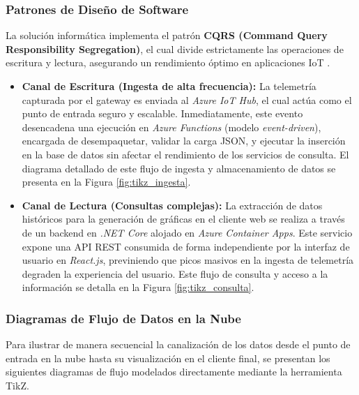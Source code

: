 \subsubsection{Patrones de Diseño de Software}
La solución informática implementa el patrón \textbf{CQRS (Command Query Responsibility Segregation)}, el cual divide estrictamente las operaciones de escritura y lectura, asegurando un rendimiento óptimo en aplicaciones IoT \cite{design_patterns}.
\begin{itemize}
    \item \textbf{Canal de Escritura (Ingesta de alta frecuencia):} La telemetría capturada por el gateway es enviada al \textit{Azure IoT Hub}, el cual actúa como el punto de entrada seguro y escalable. Inmediatamente, este evento desencadena una ejecución en \textit{Azure Functions} (modelo \textit{event-driven}), encargada de desempaquetar, validar la carga JSON, y ejecutar la inserción en la base de datos sin afectar el rendimiento de los servicios de consulta. El diagrama detallado de este flujo de ingesta y almacenamiento de datos se presenta en la Figura \ref{fig:tikz_ingesta}.
    \item \textbf{Canal de Lectura (Consultas complejas):} La extracción de datos históricos para la generación de gráficas en el cliente web se realiza a través de un backend en \textit{.NET Core} alojado en \textit{Azure Container Apps}. Este servicio expone una API REST consumida de forma independiente por la interfaz de usuario en \textit{React.js}, previniendo que picos masivos en la ingesta de telemetría degraden la experiencia del usuario. Este flujo de consulta y acceso a la información se detalla en la Figura \ref{fig:tikz_consulta}.
\end{itemize}

\subsubsection{Diagramas de Flujo de Datos en la Nube}

Para ilustrar de manera secuencial la canalización de los datos desde el punto de entrada en la nube hasta su visualización en el cliente final, se presentan los siguientes diagramas de flujo modelados directamente mediante la herramienta TikZ.

\usetikzlibrary{shapes.geometric, arrows.meta, positioning, calc, fit, backgrounds}

